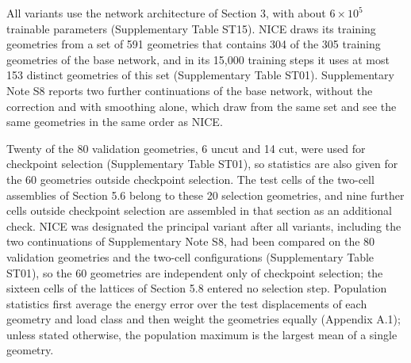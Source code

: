 \documentclass[preprint,12pt,authoryear]{elsarticle}
\begin{document}
All variants use the network architecture of Section 3, with about \(6\times10^5\) trainable parameters (Supplementary Table ST15). NICE draws its training geometries from a set of 591 geometries that contains 304 of the 305 training geometries of the base network, and in its 15,000 training steps it uses at most 153 distinct geometries of this set (Supplementary Table ST01). Supplementary Note S8 reports two further continuations of the base network, without the correction and with smoothing alone, which draw from the same set and see the same geometries in the same order as NICE.

Twenty of the 80 validation geometries, 6 uncut and 14 cut, were used for checkpoint selection (Supplementary Table ST01), so statistics are also given for the 60 geometries outside checkpoint selection. The test cells of the two-cell assemblies of Section 5.6 belong to these 20 selection geometries, and nine further cells outside checkpoint selection are assembled in that section as an additional check. NICE was designated the principal variant after all variants, including the two continuations of Supplementary Note S8, had been compared on the 80 validation geometries and the two-cell configurations (Supplementary Table ST01), so the 60 geometries are independent only of checkpoint selection; the sixteen cells of the lattices of Section 5.8 entered no selection step. Population statistics first average the energy error over the test displacements of each geometry and load class and then weight the geometries equally (Appendix A.1); unless stated otherwise, the population maximum is the largest mean of a single geometry.
\end{document}
